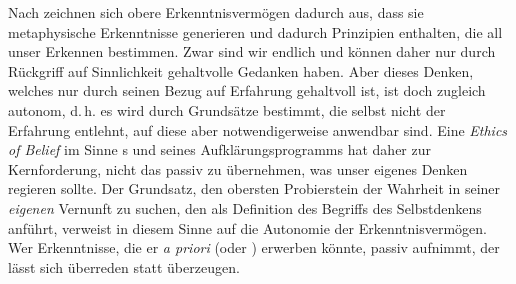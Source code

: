 Nach  zeichnen sich obere Erkenntnisvermögen dadurch aus,
dass sie metaphysische Erkenntnisse generieren und dadurch Prinzipien enthalten,
die all unser Erkennen bestimmen. Zwar sind wir endlich und können daher nur
durch Rückgriff auf Sinnlichkeit gehaltvolle Gedanken haben. Aber dieses Denken,
welches nur durch seinen Bezug auf Erfahrung gehaltvoll ist, ist doch zugleich
autonom, d.\,h. es wird durch Grundsätze bestimmt, die selbst nicht der
Erfahrung entlehnt, auf diese aber notwendigerweise anwendbar sind.
Eine \emph{Ethics of Belief} im Sinne s und seines
Aufklärungsprogramms hat daher zur Kernforderung, nicht das passiv zu
übernehmen, was unser eigenes Denken regieren sollte. Der Grundsatz, den
obersten Probierstein der Wahrheit in seiner \emph{eigenen} Vernunft zu suchen,
den  als Definition des Begriffs des Selbstdenkens anführt,
verweist in diesem Sinne auf die Autonomie der Erkenntnisvermögen. Wer
Erkenntnisse, die er \emph{a priori} (oder )
erwerben könnte, passiv aufnimmt, der lässt sich überreden statt überzeugen.


\begin{comment}
Gerade in Fragen der Religion kommt zum Vorschein, wie pikant die Ergebnisse der
Vernunftkritik aus aufklärerischer Perspektive sind. Die Unmöglichkeit objektiv
gültiger Urteile bezüglich der Existenz Gottes befördert intellektuelle Freiheit
in Religionssachen entgegen dem ersten Anschein gerade nicht, sondern stellt
eine Gefährdung derselben dar. Der aufgeklärte Mensch benötigt einen allgemeinen
Maßstab der Vernunft, sonst bleibt ihm nur die Urteilsenthaltung. Um diesen Maßstab
zu entwickeln bedarf es der Theorie eines praktischen Vernunftglaubens. Diese
Konzeption eines Vernunftglaubens ist gerade Ausdruck der Spannung zwischen
Aufklärung und ihrer Forderung nach Selbstdenken und Mündigkeit auf der einen
und unserer Endlichkeit und der ihr geschuldeten Begrenzung unseres
Erkenntnisbereichs auf der anderen Seite.
\end{comment}